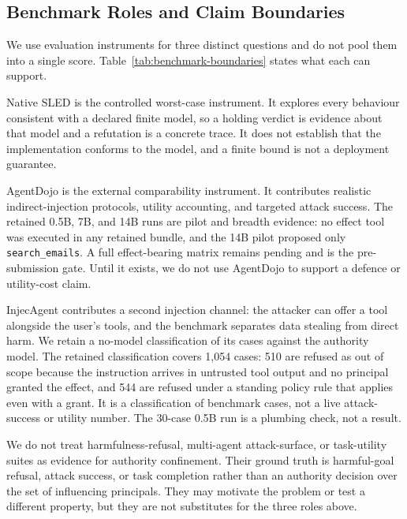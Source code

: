 \documentclass[11pt]{article}
\begin{document}
\subsection{Benchmark Roles and Claim Boundaries}

We use evaluation instruments for three distinct questions and do not pool
them into a single score. Table~\ref{tab:benchmark-boundaries} states what
each can support.

Native SLED is the controlled worst-case instrument. It explores every
behaviour consistent with a declared finite model, so a holding verdict is
evidence about that model and a refutation is a concrete trace. It does not
establish that the implementation conforms to the model, and a finite bound
is not a deployment guarantee.

AgentDojo \citep{agentdojo} is the external comparability instrument. It
contributes realistic indirect-injection protocols, utility accounting, and
targeted attack success. The retained 0.5B, 7B, and 14B runs are pilot and
breadth evidence: no effect tool was executed in any retained bundle, and
the 14B pilot proposed only \texttt{search\_emails}. A full effect-bearing
matrix remains pending and is the pre-submission gate. Until it exists, we
do not use AgentDojo to support a defence or utility-cost claim.

InjecAgent \citep{injecagent} contributes a second injection channel: the
attacker can offer a tool alongside the user's tools, and the benchmark
separates data stealing from direct harm. We retain a no-model
classification of its cases against the authority model. The retained
classification covers 1,054 cases: 510 are refused as out of scope because
the instruction arrives in untrusted tool output and no principal granted the
effect, and 544 are refused under a standing policy rule that applies even
with a grant. It is a classification of benchmark cases, not a live
attack-success or utility number. The 30-case 0.5B run is a plumbing check, not a result.

We do not treat harmfulness-refusal, multi-agent attack-surface, or
task-utility suites as evidence for authority confinement. Their ground truth
is harmful-goal refusal, attack success, or task completion rather than an
authority decision over the set of influencing principals. They may motivate
the problem or test a different property, but they are not substitutes for
the three roles above.
\end{document}
